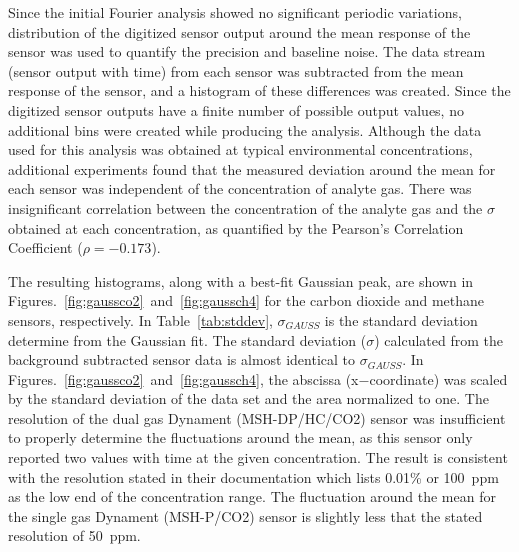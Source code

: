 \documentclass[times]{joehreview}
\begin{document}
	Since the initial Fourier analysis showed no significant periodic variations, distribution of the digitized sensor output around the mean response of the sensor was used to quantify the precision and baseline noise.  The data stream (sensor output with time) from each sensor was subtracted from the mean response of the sensor, and a histogram of these differences was created. Since the digitized sensor outputs have a finite number of possible output values, no additional bins were created while producing the analysis.  Although the data used for this analysis was obtained at typical environmental concentrations, additional experiments found that the measured deviation around the mean for each sensor was independent of the concentration of analyte gas.  There was insignificant correlation between the concentration of the analyte gas and the $\sigma$ obtained at each concentration, as quantified by the Pearson's Correlation Coefficient ($\rho=-0.173$).
	
	The resulting histograms, along with a best-fit Gaussian peak, are shown in Figures.~\ref{fig:gaussco2}~and~\ref{fig:gaussch4} for the carbon dioxide and methane sensors, respectively.  In Table~\ref{tab:stddev}, $\sigma_{GAUSS}$ is the standard deviation determine from the Gaussian fit.  The standard deviation ($\sigma$) calculated from the background subtracted sensor data is almost identical to $\sigma_{GAUSS}$.  In Figures.~\ref{fig:gaussco2}~and~\ref{fig:gaussch4}, the abscissa (x$-$coordinate) was scaled by the standard deviation of the data set and the area normalized to one.  The resolution of the dual gas Dynament (MSH-DP/HC/CO2) sensor was insufficient to properly determine the fluctuations around the mean, as this sensor only reported two values with time at the given concentration.  The result is consistent with the resolution stated in their documentation which lists 0.01\% or 100~ppm as the low end of the concentration range.  The fluctuation around the mean for the single gas Dynament (MSH-P/CO2) sensor is slightly less that the stated resolution of 50~ppm.
	
\end{document}
